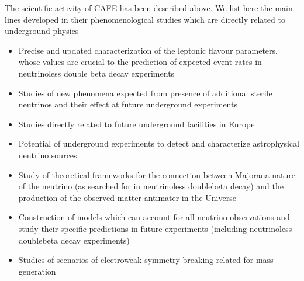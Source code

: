 \documentclass[a4paper,11pt,oneside]{article}
\begin{document}
The scientific activity of CAFE has been described above. We list
here the main lines developed in their phenomenological studies
which are directly related to underground physics
\begin{itemize}
\item Precise and updated characterization of the leptonic flavour
parameters, whose values are crucial to the prediction of expected
event rates in neutrinoless double beta decay experiments
\cite{Song:2015xaa,Bergstrom:2015rba,Gonzalez-Garcia:2014bfa,Gonzalez-Garcia:2013usa,GonzalezGarcia:2012sz,GonzalezGarcia:2011my,GonzalezGarcia:2010un,GonzalezGarcia:2010er}
\item Studies of new phenomena expected from presence of additional
sterile neutrinos and their effect at future underground experiments
\cite{Vincent:2014rja,Bergstrom:2014fqa,Adey:2014rfv,GonzalezGarcia:2012yq,SolagurenBeascoa:2012cz,Donini:2011jh,Abazajian:2012ys}
\item Studies directly related to future underground facilities
in Europe 
\cite{Bross:2013oua,Edgecock:2013lga,Blennow:2013swa,Bayes:2012ex,Agarwalla:2012zu,Hernandez:2012zz,Coloma:2012wq,Coloma:2011rq,Donini:2010xk,Coloma:2010wa,Choubey:2009ks,Bandyopadhyay:2007kx}
\item Potential of underground experiments to detect and 
characterize astrophysical neutrino sources 
\cite{Bergstrom:2016cbh,Gonzalez-Garcia:2013iha,Ahlers:2011jj,Ahlers:2010fw,GonzalezGarcia:2009ya,GonzalezGarcia:2009jc}
\item Study of theoretical frameworks for the connection  between Majorana 
nature of the neutrino (as searched for
in neutrinoless doublebeta decay) and the production of the
observed matter-antimater in the Universe
\cite{Hernandez:2015wna,Fong:2013gaa,Fong:2011yx,Fong:2010bv,Fong:2010bh,Fong:2010qh,Fong:2010zu,GonzalezGarcia:2009qd,Fong:2009iu}
\item Construction of models which can account for all neutrino observations
and study their specific predictions in future experiments
(including neutrinoless doublebeta decay experiments)
\cite{Gago:2015vma,Hernandez:2014fha,Hernandez:2013lza,Donini:2012tt,Eboli:2011ia,Gavela:2009cd}
\item Studies of scenarios of electroweak symmetry breaking related
for mass generation
\cite{Corbett:2015lfa,Corbett:2014ora,Gavela:2014vra,Brivio:2014pfa,Brivio:2013pma,Corbett:2013pja,Corbett:2012ja,Corbett:2012dm,Eboli:2011ye,Eboli:2011bq,Eboli:2010qd,Alves:2009aa}
\end{itemize}
%
\end{document}
